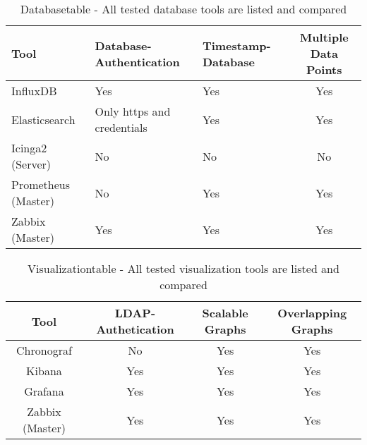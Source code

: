 \begin{table}
\centering

\begin{tabular}{p{3cm}p{3cm}p{3cm}c}
	\hline
Tool & Database-Authentication     & Timestamp-Database          & Multiple Data Points        \\
\hline
InfluxDB                     & Yes & Yes                         & Yes                         \\
Elasticsearch                & Only https and credentials  & Yes & Yes                         \\
Icinga2 (Server)             & No                          & No                          & No                          \\
Prometheus (Master)          & No                          & Yes & Yes                         \\
Zabbix (Master)              & Yes                         & Yes                         & Yes\\
\hline
\end{tabular}
\caption{Databasetable - All tested database tools are listed and compared}
\label{tab:database}
\end{table}

\begin{table} 
\centering

\begin{tabular}{cccc}
	\hline
Tool & LDAP-Authetication         & Scalable Graphs             & Overlapping Graphs          \\
\hline
Chronograf                   & No & Yes                         & Yes                         \\
Kibana                       & Yes                        & Yes & Yes                         \\
Grafana                      & Yes                        & Yes & Yes                         \\
Zabbix (Master)              & Yes                        & Yes                         & Yes\\
\hline
\end{tabular}
\caption{Visualizationtable - All tested visualization tools are listed and compared}
\label{tab:Visualization}
\end{table}


